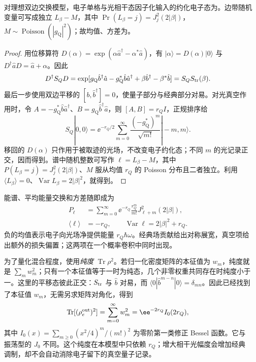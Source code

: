 \begin{proposition}[相干光输入的真空记录分解]
对理想双边交换模型，电子单格与光相干态因子化输入的约化电子态为。边带随机变量可写成独立 $L_\beta-M$，其中 $\Pr(L_\beta=j)=J_j^2(2|\beta|)$，$M\sim\operatorname{Poisson}(|g_{\mathrm Q}|^2)$；故均值、方差为。
\end{proposition}
\begin{proof}
用位移算符 $D(\alpha)=\exp(\alpha\hat a^\dagger-\alpha^*\hat a)$，有 $|\alpha\rangle=D(\alpha)|0\rangle$ 与 $D^\dagger\hat aD=\hat a+\alpha$。因此
\begin{equation*}
 D^\dagger S_QD
 =\exp[g_{\mathrm Q}\hat b^\dagger\hat a-g_{\mathrm Q}^*\hat b\hat a^\dagger
       +\beta\hat b^\dagger-\beta^*\hat b]
 =S_Q S_{\rm tr}(\beta).
\end{equation*}
最后一步使用双边平移的 $[\hat b,\hat b^\dagger]=0$，使量子部分与经典部分对易。对光真空作用时，令 $A=-g_{\mathrm Q}^*\hat b\hat a^\dagger$、$B=g_{\mathrm Q}\hat b^\dagger\hat a$，则 $[A,B]=r_Q I$，正规排序给
\begin{equation*}
 S_Q|0,0\rangle=\ee^{-r_Q/2}\sum_{m=0}^{\infty}
 \frac{(-g_{\mathrm Q}^*)^m}{\sqrt{m!}}|-m,m\rangle.
\end{equation*}
移回的 $D(\alpha)$ 只作用于被取迹的光场，不改变电子约化态；不同 $m$ 的光记录正交，因而得到。谱中随机整数可写作 $\ell=L_\beta-M$，其中 $P(L_\beta=j)=J_j^2(2|\beta|)$、$M$ 服从均值 $r_Q$ 的 Poisson 分布且二者独立。利用 $\langle L_\beta\rangle=0$、$\operatorname{Var}L_\beta=2|\beta|^2$，就得到。
\end{proof}


能谱、平均能量交换和方差随即成为
\begin{equation}
 \begin{aligned}
 P_\ell&=\sum_{m=0}^{\infty}\ee^{-r_Q}\frac{r_Q^m}{m!}
 J_{\ell+m}^2(2|\beta|),\\
 \langle\ell\rangle&=-r_Q,\qquad
 \operatorname{Var}\ell=2|\beta|^2+r_Q.
 \end{aligned}
 \label{eq:electron-coherent-light-spectrum-moments}
\end{equation}
负的均值表示电子向光场净提供能量 $r_Q\hbar\omega$。经典场贡献给出对称展宽，真空项给出额外的损失偏置；这两项在一个概率卷积中同时出现。

为了量化混合程度，使用\emph{纯度} $\operatorname{Tr}\rho^2$。若归一化密度矩阵的本征值为 $w_m$，纯度就是 $\sum_mw_m^2$；只有一个本征值等于一时为纯态，几个非零权重共同存在时纯度小于一。这里的平移态彼此正交：$S_{\rm tr}$ 与 $\hat b$ 对易，而 $\langle0|\hat b^{m-n}|0\rangle=\delta_{mn}$。因此已经找到了本征值 $w_m$，无需另求矩阵对角化，得到
\begin{equation}
 \operatorname{Tr}[(\rho_e^{\rm out})^2]
 =\sum_{m=0}^{\infty}w_m^2
 =\ee^{-2r_Q}I_0(2r_Q),
 \label{eq:electron-coherent-light-purity}
\end{equation}
其中 $I_0(x)=\sum_{m\ge0}(x^2/4)^m/(m!)^2$ 为零阶第一类修正 Bessel 函数。它与振荡型的 $J_0$ 不同。这个纯度在本模型中只依赖 $r_Q$；增大相干光幅度会增加经典调制，却不会自动消除电子留下的真空量子记录。

